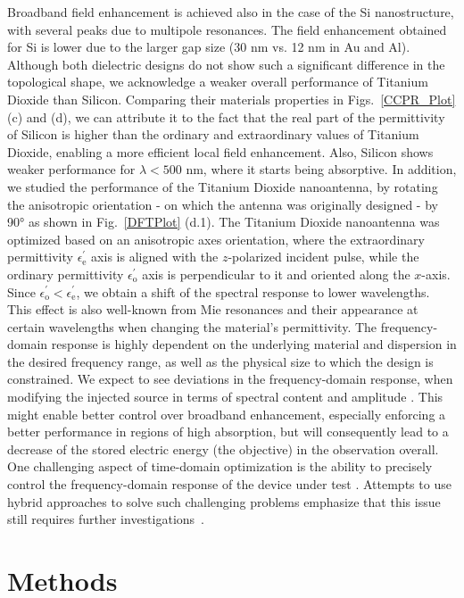 \documentclass[aps,prl,twocolumn,superscriptaddress,longbibliography]{revtex4-1}
\begin{document}
Broadband field enhancement is achieved also in the case of the Si nanostructure, with several peaks due to multipole resonances. The field enhancement obtained for Si is lower due to the larger gap size (30 nm vs. 12 nm in Au and Al). Although both dielectric designs do not show such a significant difference in the topological shape, we acknowledge a weaker overall performance of Titanium Dioxide than Silicon. Comparing their materials properties in Figs.~\ref{CCPR_Plot} (c) and (d), we can attribute it to the fact that the real part of the permittivity of Silicon is higher than the ordinary and extraordinary values of Titanium Dioxide, enabling a more efficient local field enhancement. Also, Silicon shows weaker performance for $\lambda < 500$ nm, where it starts being absorptive. 
In addition, we studied the performance of the Titanium Dioxide nanoantenna, by rotating the anisotropic orientation - on which the antenna was originally designed - by 90° as shown in Fig.~\ref{DFTPlot} (d.1). The Titanium Dioxide nanoantenna was optimized based on an anisotropic axes orientation, where the extraordinary permittivity $\epsilon^{\prime}_{\mathrm{e}}$ axis is aligned with the $z$-polarized incident pulse, while the ordinary permittivity $\epsilon^{\prime}_{\mathrm{o}}$ axis is perpendicular to it and oriented along the $x$-axis. Since $\epsilon^{\prime}_{\mathrm{o}} < \epsilon^{\prime}_{\mathrm{e}}$, we obtain a shift of the spectral response to lower wavelengths. This effect is also well-known from Mie resonances and their appearance at certain wavelengths when changing the material's permittivity. 
The frequency-domain response is highly dependent on the underlying material and dispersion in the desired frequency range, as well as the physical size to which the design is constrained. We expect to see deviations in the frequency-domain response, when modifying the injected source in terms of spectral content and amplitude \cite{Hassan:22}.
This might enable better control over broadband enhancement, especially enforcing a better performance in regions of high absorption, but will consequently lead to a decrease of the stored electric energy (the objective) in the observation overall. 
One challenging aspect of time-domain optimization is the ability to precisely control the frequency-domain response of the device under test \cite{Hassan14Topology}. 
Attempts to use hybrid approaches to solve such challenging problems emphasize that this issue still requires further investigations~\cite{meep}.


\section{Methods}\label{Sec:Methods}
\end{document}
